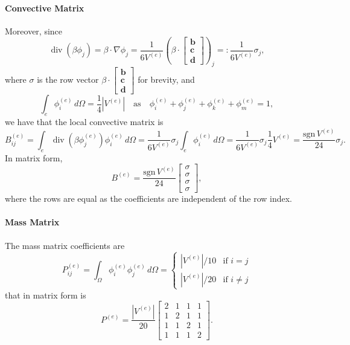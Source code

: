 \documentclass[hidelinks]{article}
\DeclareMathOperator{\divg}{div}
\begin{document}
\paragraph{Convective Matrix}
Moreover, since \[
\divg (\beta \phi_j) = \beta \cdot \nabla \phi_j = \frac{1}{6V^{(e)}}\left(\beta \cdot \begin{bmatrix}
    \mathbf{b} \\
    \mathbf{c} \\
    \mathbf{d}
\end{bmatrix} \right)_j =: \frac{1}{6V^{(e)}} \sigma_j,
\] 
where $\sigma$ is the row vector $\beta \cdot \begin{bmatrix}
    \mathbf{b} \\
    \mathbf{c} \\
    \mathbf{d}
\end{bmatrix}$ for brevity, and
\[
\int_e \phi^{(e)}_i \, d\Omega = \frac{1}{4} |V^{(e)}| \quad \text{as} \quad \phi^{(e)}_i + \phi^{(e)}_j + \phi^{(e)}_k + \phi^{(e)}_m= 1,
\]
we have that the local convective matrix is
\[
B_{ij}^{(e)} = \int_e \divg (\beta \phi^{(e)}_j) \phi^{(e)}_i \, d\Omega = \frac{1}{6V^{(e)}}\sigma_j \int_e \phi^{(e)}_i \, d\Omega = \frac{1}{6V^{(e)}}\sigma_j \frac{1}{4} V^{(e)} = \frac{\text{sgn}\, V^{(e)}}{24} \sigma_j.
\]
In matrix form,
\[
B^{(e)} = \frac{\text{sgn}\, V^{(e)}}{24} \begin{bmatrix} \sigma \\ \sigma \\ \sigma \\ \sigma
\end{bmatrix},
\]
where the rows are equal as the coefficients are independent of the row index.

\paragraph{Mass Matrix} 
The mass matrix coefficients are
\[
P^{(e)}_{ij} = \int_\Omega\phi^{(e)}_i\phi^{(e)}_j\,d\Omega = \begin{cases}
    |V^{(e)}|/10 & \text{if } i = j \\
    |V^{(e)}|/20 & \text{if } i \neq j
\end{cases}
\]
that in matrix form is
\[
P^{(e)} = \frac{|V^{(e)}|}{20}\begin{bmatrix}
    2 & 1 & 1 & 1 \\ 1 & 2 & 1 & 1 \\ 1 & 1 & 2 & 1 \\ 1 & 1 & 1 & 2
\end{bmatrix}.
\]  
\end{document}
